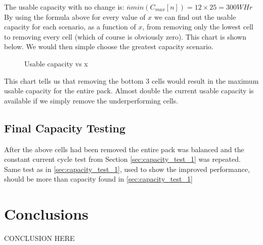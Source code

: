 \documentclass[10pt,twocolumn]{IEEEtran}
\begin{document}
The usable capacity with no change is:
$\overline{n} min(C_{max}[n]) = 12 \times 25 = 300WHr$
By using the formula above for every value of $x$ we can find out the usable capacity for each scenario, as a function of $x$, from removing only the lowest cell to removing every cell (which of course is obviously zero). This chart is shown below. We would then simple choose the greatest capacity scenario.

  
\begin{figure}[t]
\centering
\vspace{-0.2cm}
{} \vspace{-0.1cm}
\caption{Usable capacity vs x}
\vspace{-0.3cm}
\label{fig:cell_removal2}
\end{figure} 

This chart tells us that removing the bottom 3 cells would result in the maximum usable capacity for the entire pack. Almost double the current usable capacity is available if we simply remove the underperforming cells.

\subsection{Final Capacity Testing}
After the above cells had been removed the entire pack was balanced and the constant current cycle test from Section \ref{sec:capacity_test_1} was repeated.
\color{red}
Same test as in \ref{sec:capacity_test_1}, used to show the improved performance, should be more than capacity found in \ref{sec:capacity_test_1}
\color{black}
\section{Conclusions}

\color{red}CONCLUSION HERE\color{black}



\end{document}
